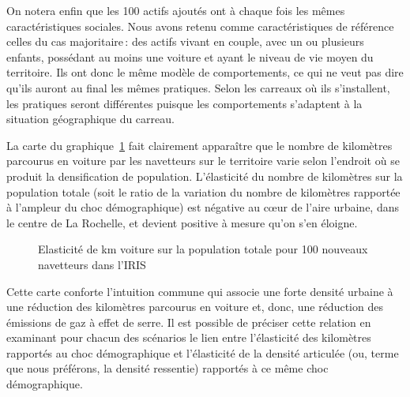 \documentclass[
  9pt,
  a4paper,
  DIV=11]{scrreprt}
\begin{document}
On notera enfin que les 100 actifs ajoutés ont à chaque fois les mêmes
caractéristiques sociales. Nous avons retenu comme caractéristiques de
référence celles du cas majoritaire\,: des actifs vivant en couple, avec
un ou plusieurs enfants, possédant au moins une voiture et ayant le
niveau de vie moyen du territoire. Ils ont donc le même modèle de
comportements, ce qui ne veut pas dire qu'ils auront au final les mêmes
pratiques. Selon les carreaux où ils s'installent, les pratiques seront
différentes puisque les comportements s'adaptent à la situation
géographique du carreau.

La carte du graphique~\ref{fig-elas-km-pop} fait clairement apparaître
que le nombre de kilomètres parcourus en voiture par les navetteurs sur
le territoire varie selon l'endroit où se produit la densification de
population. L'élasticité du nombre de kilomètres sur la population
totale (soit le ratio de la variation du nombre de kilomètres rapportée
à l'ampleur du choc démographique) est négative au cœur de l'aire
urbaine, dans le centre de La Rochelle, et devient positive à mesure
qu'on s'en éloigne.

\begin{figure}[htb]

\caption{\label{fig-elas-km-pop}Elasticité de km voiture sur la
population totale pour 100 nouveaux navetteurs dans l'IRIS}


\end{figure}%

Cette carte conforte l'intuition commune qui associe une forte densité
urbaine à une réduction des kilomètres parcourus en voiture et, donc,
une réduction des émissions de gaz à effet de serre. Il est possible de
préciser cette relation en examinant pour chacun des scénarios le lien
entre l'élasticité des kilomètres rapportés au choc démographique et
l'élasticité de la densité articulée (ou, terme que nous préférons, la
densité ressentie) rapportés à ce même choc démographique.
\end{document}
